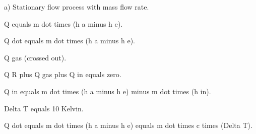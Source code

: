 a) Stationary flow process with mass flow rate.  

Q equals m dot times (h a minus h e).  

Q dot equals m dot times (h a minus h e).  

Q gas (crossed out).  

Q R plus Q gas plus Q in equals zero.  

Q in equals m dot times (h a minus h e) minus m dot times (h in).  

Delta T equals 10 Kelvin.  

Q dot equals m dot times (h a minus h e) equals m dot times c times (Delta T).
